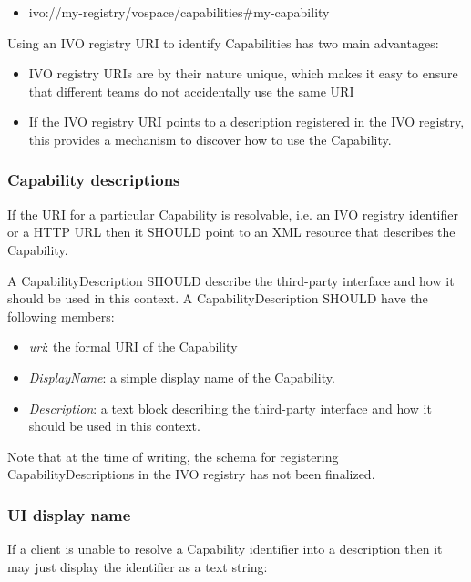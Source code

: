 \documentclass[11pt,a4paper]{ivoa}
\begin{document}
\begin{itemize}
    \item ivo://my-registry/vospace/capabilities\#my-capability
\end{itemize}

Using an IVO registry URI to identify Capabilities has two main advantages:

\begin{itemize}
    \item IVO registry URIs are by their nature unique, which makes it easy to ensure that different teams do not accidentally use the same URI
    \item If the IVO registry URI points to a description registered in the IVO registry, this provides a mechanism to discover how to use the Capability.
\end{itemize}

\subsubsection{Capability descriptions}
\label{subsubsec:capability descriptions}
If the URI for a particular Capability is resolvable, i.e. an IVO registry identifier or a HTTP URL then it SHOULD point to an XML resource that describes the Capability.

A CapabilityDescription SHOULD describe the third-party interface and how it should be used in this context. A CapabilityDescription SHOULD have the following members:

\begin{itemize}
    \item \emph{uri}: the formal URI of the Capability
    \item \emph{DisplayName}: a simple display name of the Capability.
    \item \emph{Description}: a text block describing the third-party interface and how it should be used in this context.
\end{itemize}

Note that at the time of writing, the schema for registering CapabilityDescriptions in the IVO registry has not been finalized.

\subsubsection{UI display name}
\label{subsubsection:ui display ame}
If a client is unable to resolve a Capability identifier into a description then it may just display the identifier as a text string:
\end{document}
